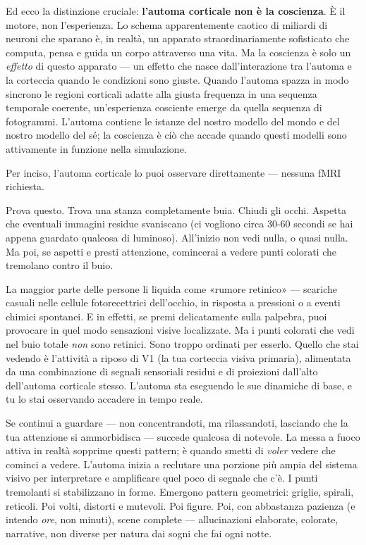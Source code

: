 \documentclass[11pt, twoside, openright]{book}
\begin{document}
Ed ecco la distinzione cruciale: \textbf{l'automa corticale non è la coscienza}. È il motore, non l'esperienza. Lo schema apparentemente caotico di miliardi di neuroni che sparano è, in realtà, un apparato straordinariamente sofisticato che computa, pensa e guida un corpo attraverso una vita. Ma la coscienza è solo un \textit{effetto} di questo apparato --- un effetto che nasce dall'interazione tra l'automa e la corteccia quando le condizioni sono giuste. Quando l'automa spazza in modo sincrono le regioni corticali adatte alla giusta frequenza in una sequenza temporale coerente, un'esperienza cosciente emerge da quella sequenza di fotogrammi. L'automa contiene le istanze del nostro modello del mondo e del nostro modello del sé; la coscienza è ciò che accade quando questi modelli sono attivamente in funzione nella simulazione.

Per inciso, l'automa corticale lo puoi osservare direttamente --- nessuna fMRI richiesta.

Prova questo. Trova una stanza completamente buia. Chiudi gli occhi. Aspetta che eventuali immagini residue svaniscano (ci vogliono circa 30-60 secondi se hai appena guardato qualcosa di luminoso). All'inizio non vedi nulla, o quasi nulla. Ma poi, se aspetti e presti attenzione, comincerai a vedere punti colorati che tremolano contro il buio.

La maggior parte delle persone li liquida come «rumore retinico» --- scariche casuali nelle cellule fotorecettrici dell'occhio, in risposta a pressioni o a eventi chimici spontanei. E in effetti, se premi delicatamente sulla palpebra, puoi provocare in quel modo sensazioni visive localizzate. Ma i punti colorati che vedi nel buio totale \textit{non} sono retinici. Sono troppo ordinati per esserlo. Quello che stai vedendo è l'attività a riposo di V1 (la tua corteccia visiva primaria), alimentata da una combinazione di segnali sensoriali residui e di proiezioni dall'alto dell'automa corticale stesso. L'automa sta eseguendo le sue dinamiche di base, e tu lo stai osservando accadere in tempo reale.

Se continui a guardare --- non concentrandoti, ma rilassandoti, lasciando che la tua attenzione si ammorbidisca --- succede qualcosa di notevole. La messa a fuoco attiva in realtà sopprime questi pattern; è quando smetti di \textit{voler} vedere che cominci a vedere. L'automa inizia a reclutare una porzione più ampia del sistema visivo per interpretare e amplificare quel poco di segnale che c'è. I punti tremolanti si stabilizzano in forme. Emergono pattern geometrici: griglie, spirali, reticoli. Poi volti, distorti e mutevoli. Poi figure. Poi, con abbastanza pazienza (e intendo \textit{ore}, non minuti), scene complete --- allucinazioni elaborate, colorate, narrative, non diverse per natura dai sogni che fai ogni notte.
\end{document}
